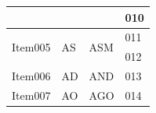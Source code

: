 \documentclass[12pt, a4paper]{article}
\begin{document}
\begin{table}
\begin{tabular}{|l||l|l|l|}
		\multirow{2}{*}{}  &
		\multirow{2}{*}{}  &
		\multirow{2}{*}{}  &
		010 \\
		\hline 
		
		\multirow{2}{*}{Item005}  &
		\multirow{2}{*}{AS}  &
		\multirow{2}{*}{ASM}  &
		011 \\
		
		\multirow{2}{*}{}  &
		\multirow{2}{*}{}  &
		\multirow{2}{*}{}  &
		012 \\
		\hline 
		
		Item006 & 
		AD &
		AND & 
		013 \\ 
		\hline 
		
		Item007 & 
		AO &
		AGO & 
		014 \\ 
		\hline 
		\hline 
		
	\end{tabular}
	\end{table}

\pagebreak
\end{document}
